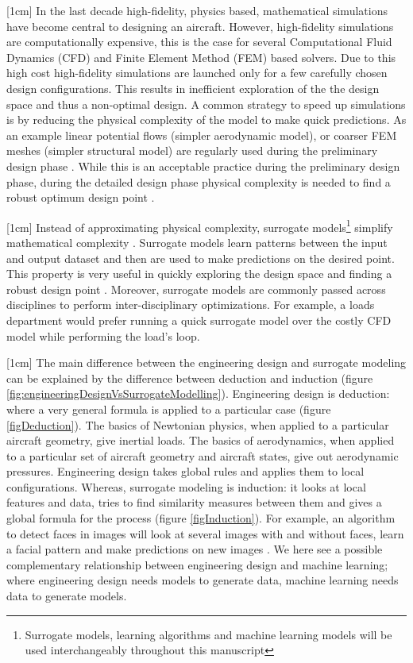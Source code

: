 [1cm]
In the last decade high-fidelity, physics based, mathematical simulations have become central to designing an aircraft. However, high-fidelity simulations are computationally expensive, this is the case for several Computational Fluid Dynamics (CFD) and Finite Element Method (FEM) based solvers. Due to this high cost high-fidelity simulations are launched only for a few carefully chosen design configurations. This results in inefficient exploration of the the design space and thus a non-optimal design. A common strategy to speed up simulations is by reducing the physical complexity of the model to make quick predictions. As an example linear potential flows (simpler aerodynamic model), or coarser FEM meshes (simpler structural model) are regularly used during the preliminary design phase \cite{cummings2015applied}. While this is an acceptable practice during the preliminary design phase, during the detailed design phase physical complexity is needed to find a robust optimum design point \cite{raymer2012aircraft}.

[1cm]
Instead of approximating physical complexity, surrogate models\footnote{Surrogate models, learning algorithms and machine learning models will be used interchangeably throughout this manuscript} simplify mathematical complexity \cite{verveld2016reduced}. Surrogate models learn patterns between the input and output dataset and then are used to make predictions on the desired point. This property is very useful in quickly exploring the design space and finding a robust design point \cite{forrester2008engineering}. Moreover, surrogate models are commonly passed across disciplines to perform inter-disciplinary optimizations. For example, a loads department would prefer running a quick surrogate model over the costly CFD model while performing the load's loop.  

[1cm]
The main difference between the engineering design and surrogate modeling can be explained by the difference between deduction and induction \cite{domingos2012few} (figure \ref{fig:engineeringDesignVsSurrogateModelling}). Engineering design is deduction: where a very general formula is applied to a particular case (figure \ref{figDeduction}). The basics of Newtonian physics, when applied to a particular aircraft geometry, give inertial loads. The basics of aerodynamics, when applied to a particular set of aircraft geometry and aircraft states, give out aerodynamic pressures. Engineering design takes global rules and applies them to local configurations. Whereas, surrogate modeling is induction: it looks at local features and data, tries to find similarity measures between them and gives a global formula for the process (figure \ref{figInduction}). For example, an algorithm to detect faces in images will look at several images with and without faces, learn a facial pattern and make predictions on new images \cite{marszalek2007semantic}. We here see a possible complementary relationship between engineering design and machine learning; where engineering design needs models to generate data, machine learning needs data to generate models.

